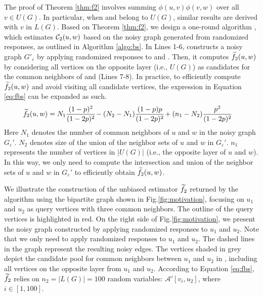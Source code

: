 The proof of Theorem \ref{thm:f2} involves summing $\phi(u, v) \phi(v, w)$ over all $v \in U(G)$. 
In particular, when \vq and \vx belong to $U(G)$, similar results are derived with $v$ in $L(G)$. 
Based on Theorem \ref{thm:f2}, we design a one-round algorithm \bs, which estimates $\mathcal{C}_2(u,w)$ based on the noisy graph generated from randomized responses, as outlined in Algorithm \ref{algo:bs}. In Lines 1-6, \bs constructs a noisy graph $G'_{\varepsilon}$ by applying randomized responses to \vq and \vx. 
Then, it computes $\widetilde{f}_2(u, w)$ by considering all vertices on the opposite layer (i.e., $U(G)$) as candidates for the common neighbors of \vq and \vx (Lines 7-8). 
In practice, to efficiently compute $\widetilde{f}_2(u, w)$ and avoid visiting all candidate vertices, the expression in Equation \ref{eq:fbs} can be expanded as such. 
{\color{black}
\begin{align*}
\widetilde{f}_2(u, w) & = N_1  \frac{{(1 - p)^2}}{{(1 - 2p)^2}} 
\hspace{-0.5mm} - (N_2 - N_1)  \frac{{(1 - p)  p}}{{(1 - 2p)^2}} 
\hspace{-0.5mm} + ( n_1-N_2 )  \frac{{p^2}}{{(1 - 2p)^2}}
\end{align*}
}
Here $N_1$ denotes the number of common neighbors of $u$ and $w$ in the noisy graph $G_{\varepsilon}'$. 
$N_2$ denotes size of the union of the neighbor sets of $u$ and $w$ in $G_{\varepsilon}'$. 
{\color{black}$n_1$ represents the number of vertices in $|U(G)|$ (i.e., the opposite layer of $u$ and $w$). }
In this way, we only need to compute the intersection and union of the neighbor sets of $u$ and $w$ in $G_{\varepsilon}'$ to efficiently obtain $\widetilde{f}_2(u, w)$. 


\begin{example}
We illustrate the construction of the unbiased estimator $\widetilde{f}_2$ returned by the \bs algorithm using the bipartite graph shown in Fig.\ref{fig:motivation}, focusing on $u_1$ and $u_2$ as query vertices with three common neighbors. 
The outline of the query vertices is highlighted in red. 
On the right side of Fig.\ref{fig:motivation}, we present the noisy graph constructed by applying randomized responses to $u_1$ and $u_2$. Note that we only need to apply randomized responses to $u_1$ and $u_2$. The dashed lines in the graph represent the resulting noisy edges. 
The vertices shaded in grey depict the candidate pool for common neighbors between $u_1$ and $u_2$ in \bs, including all vertices on the opposite layer from $u_1$ and $u_2$. 
According to Equation \ref{eq:fbs}, $\widetilde{f}_2$ relies on $n_2 = |L(G)|=100$ random variables: $\mathcal{A}'[v_i, u_2]$, where $i \in [1, 100]$. 
\end{example}


